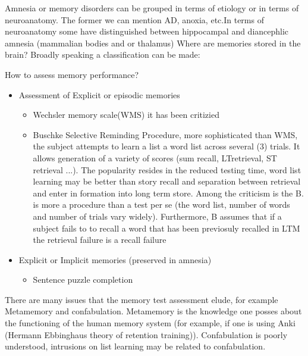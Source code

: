 \documentclass[11pt]{article}
\theoremstyle{definition}
\theoremstyle{remark}
\begin{document}
Amnesia or memory disorders can be grouped in terms of etiology or in terms of neuroanatomy. The former we can mention AD, anoxia, etc.In terms of neuroanatomy some have distinguished between hippocampal and diancephlic amnesia (mammalian bodies and or thalamus)
Where are memories stored in the brain? Broadly speaking a classification can be made:

How to assess memory performance?
\begin{itemize}
\item Assessment of Explicit or episodic memories 
\begin{itemize}
  \item Wechsler memory scale(WMS) it has been critizied
  \item Buschke Selective Reminding Procedure, more sophisticated than WMS, the subject attempts to learn a list a word list across several (3) trials. It allows generation of a variety of scores (sum recall, LTretrieval, ST retrieval ...). The popularity resides in the reduced testing time, word list learning may be better than story recall and separation between retrieval and enter in formation into long term store. Among the criticism is the B. is more a procedure than a test per se (the word list, number of words and number of trials vary widely). Furthermore, B assumes that if a subject fails to to recall a word that has been previosuly recalled in LTM the retrieval failure is a recall failure
\end{itemize}  
\item Explicit or Implicit memories (preserved in amnesia)
\begin{itemize}
\item  Sentence puzzle completion
\end{itemize}
\end{itemize}  
There are many issues that the memory test assessment elude, for example Metamemory and confabulation. Metamemory is the knowledge one posses about the functioning of the human memory system (for example, if one is using Anki (Hermann Ebbinghaus theory of retention training)). Confabulation is poorly understood, intrusions on list learning may be related to confabulation.
\end{document}
